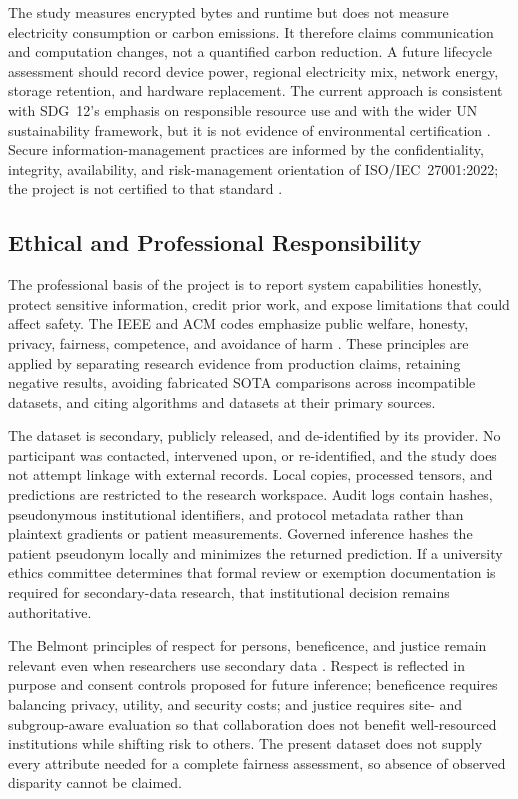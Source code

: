 The study measures encrypted bytes and runtime but does not measure electricity consumption or carbon emissions. It therefore claims communication and computation changes, not a quantified carbon reduction. A future lifecycle assessment should record device power, regional electricity mix, network energy, storage retention, and hardware replacement. The current approach is consistent with SDG~12's emphasis on responsible resource use and with the wider UN sustainability framework, but it is not evidence of environmental certification \cite{un2015sdgs}. Secure information-management practices are informed by the confidentiality, integrity, availability, and risk-management orientation of ISO/IEC~27001:2022; the project is not certified to that standard \cite{iso27001_2022}.

\subsection{Ethical and Professional Responsibility}
\label{subsec:ethics}

The professional basis of the project is to report system capabilities honestly, protect sensitive information, credit prior work, and expose limitations that could affect safety. The IEEE and ACM codes emphasize public welfare, honesty, privacy, fairness, competence, and avoidance of harm \cite{ieee2026ethics,acm2018ethics}. These principles are applied by separating research evidence from production claims, retaining negative results, avoiding fabricated SOTA comparisons across incompatible datasets, and citing algorithms and datasets at their primary sources.

The dataset is secondary, publicly released, and de-identified by its provider. No participant was contacted, intervened upon, or re-identified, and the study does not attempt linkage with external records. Local copies, processed tensors, and predictions are restricted to the research workspace. Audit logs contain hashes, pseudonymous institutional identifiers, and protocol metadata rather than plaintext gradients or patient measurements. Governed inference hashes the patient pseudonym locally and minimizes the returned prediction. If a university ethics committee determines that formal review or exemption documentation is required for secondary-data research, that institutional decision remains authoritative.

The Belmont principles of respect for persons, beneficence, and justice remain relevant even when researchers use secondary data \cite{belmont1979}. Respect is reflected in purpose and consent controls proposed for future inference; beneficence requires balancing privacy, utility, and security costs; and justice requires site- and subgroup-aware evaluation so that collaboration does not benefit well-resourced institutions while shifting risk to others. The present dataset does not supply every attribute needed for a complete fairness assessment, so absence of observed disparity cannot be claimed.

